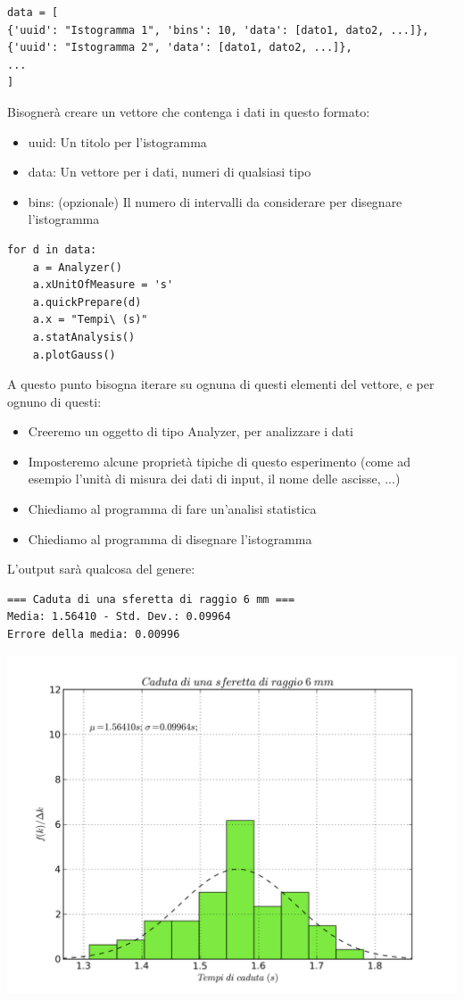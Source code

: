 \begin{lstlisting}
data = [
{'uuid': "Istogramma 1", 'bins': 10, 'data': [dato1, dato2, ...]},
{'uuid': "Istogramma 2", 'data': [dato1, dato2, ...]},
...
]
\end{lstlisting}

Bisognerà creare un vettore che contenga i dati in questo formato:
\begin{itemize}
 \item uuid: Un titolo per l'istogramma
 \item data: Un vettore per i dati, numeri di qualsiasi tipo
 \item bins: (opzionale) Il numero di intervalli da considerare per disegnare l'istogramma
\end{itemize}

\begin{lstlisting}
for d in data:
    a = Analyzer()
    a.xUnitOfMeasure = 's'
    a.quickPrepare(d)
    a.x = "Tempi\ (s)"
    a.statAnalysis()
    a.plotGauss()
\end{lstlisting}

A questo punto bisogna iterare su ognuna di questi elementi del vettore, e per ognuno di questi:
\begin{itemize}
 \item Creeremo un oggetto di tipo Analyzer, per analizzare i dati
 \item Imposteremo alcune proprietà tipiche di questo esperimento (come ad esempio l'unità di misura dei dati di input, il nome delle ascisse, ...)
 \item Chiediamo al programma di fare un'analisi statistica
 \item Chiediamo al programma di disegnare l'istogramma
\end{itemize}

L'output sarà qualcosa del genere:
       
\begin{verbatim}
=== Caduta di una sferetta di raggio 6 mm ===
Media: 1.56410 - Std. Dev.: 0.09964
Errore della media: 0.00996
\end{verbatim}

\includegraphics[scale=0.75]{../grafici/esempio/Cadutadiunasferettadiraggio6mm.png}


